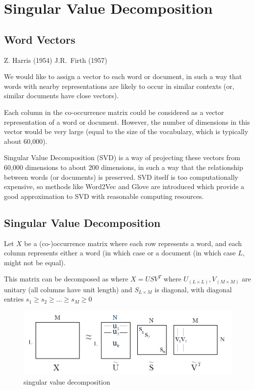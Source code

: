 \documentclass[11pt]{article}
\begin{document}
\section{Singular Value Decomposition}\label{sec:singular-value-decomposition}
\subsection{Word Vectors}\label{subsec:word-vectors}
 Z. Harris (1954)
 J.R.\ Firth (1957)

We would like to assign a vector to each word or document, in such a way that words with nearby representations are likely to occur in similar contexts (or, similar documents have close vectors).

Each column in the co-occurrence matrix could be considered as a vector representation of a word or document.
However, the number of dimensions in this vector would be very large (equal to the size of the vocabulary, which is typically about 60,000).

Singular Value Decomposition (SVD) is a way of projecting these vectors from 60,000 dimensions to about 200 dimensions, in such a way that the relationship between words (or documents) is preserved.
SVD itself is too computationally expensive, so methods like Word2Vec and Glove are introduced which provide a good approximation to SVD with reasonable computing resources.

\subsection{Singular Value Decomposition}\label{subsec:singular-value-decomposition2}
Let $X$ be a (co-)occurrence matrix where each row represents a word, and each column represents either a word (in which case  or a document (in which case $L$, might not be equal).

This matrix  can be decomposed as where $X = USV^T$ where $U_{(L \times L)}, V_{(M \times M)}$ are unitary (all columns have unit length) and $S_{L \times M}$ is diagonal, with diagonal entries $s_1 \geq s_2 \geq \dots \geq s_M \geq 0$

\begin{figure}[H]
    \centering
    \includegraphics{../out/images/singular-value-decomposition}
    \caption[singular value decomposition]{singular value decomposition}
    \label{fig:singular value decomposition}
\end{figure}
\end{document}
